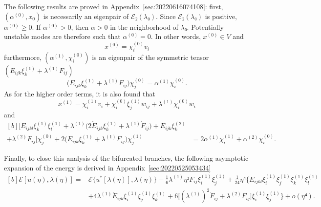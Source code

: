 \documentclass[12pt, final]{scrartcl}
\theoremstyle{definition}
\newcommand{\order}[2][1]{#2^{(#1)}}
\begin{document}
The following results are proved in Appendix~\ref{sec:20220616074108}: first,
\((\order[0]α, x_0)\) is necessarily an eigenpair of \(ℰ₂(λ₀)\). Since \(ℰ₂ (λ₀)\) is
positive, \(\order[0]α ≥ 0\). If \(\order[0]α>0\), then \(α>0\) in the neighborhood of
\(λ₀\). Potentially unstable modes are therefore such that \(\order[0]α=0\). In other
words, \(\order[0]x ∈ V\) and
\begin{equation}
  \label{eq:20220904160057}
  \order[0]x = \order[0]{χ_i} v_i
\end{equation}
furthermore, \((\order[1]α, \order[0]{χ_i})\) is an eigenpair of the symmetric
tensor \((E_{ijk} \order[1]{ξ_k} + \order[1]λ F_{ij})\)
\begin{equation}
  \label{eq:20220609133608}
  \bigl(E_{ijk} \order[1]{ξ_k} + \order[1]λ F_{ij} \bigr) \order[0]{χ_j} = \order[1]α \order[0]{χ_i}.
\end{equation}
As for the higher order terms, it is also found that
\begin{equation}
  \label{eq:20220609133629}
  \order[1]x = \order[1]{χ_i} v_i +  \order[0]{χ_i} \order[1]{ξ_j} w_{i j} + \order[1]λ \order[0]{χ_i} w_i
\end{equation}
and
\begin{equation}
  \label{eq:20220616082923}
  \begin{aligned}[b]
    \bigl[E_{ijkl} \order[1]{ξ_k} \order[1]{ξ_l} + \order[1]λ\bigl(2 \mathring{E}_{ijk} \order[1]{ξ_k} + \order[1]λ \mathring{F}_{ij}\bigr) + E_{ijk} \order[2]{ξ_k}
    &\\
    + \order[2]λ F_{ij} \bigr] \order[0]{χ_j} + 2\bigl(E_{ijk}  \order[1]{ξ_k} + \order[1]λ F_{ij} \bigr) \order[1]{χ_j}
    & = 2\order[1]α\order[1]{χ_i} + \order[2]α \order[0]{χ_i}.
  \end{aligned}
\end{equation}

Finally, to close this analysis of the bifurcated branches, the following
asymptotic expansion of the energy is derived in
Appendix~\ref{sec:20220525053434}
\begin{equation}
  \label{eq:20220525053600}
  \begin{aligned}[b]
    ℰ[u(η), λ(η)] ={} & ℰ\{u^{\ast}[λ(η)], λ(η)\} + \tfrac{1}{6} \order[1]λ η³ F_{i j} \order[1]{ξ_i} \order[1]{ξ_j} + \tfrac{1}{24} η⁴ \bigl\{E_{ijkl} \order[1]{ξ_i} \order[1]{ξ_j} \order[1]{ξ_k} \order[1]{ξ_l}\\
    & + 4\order[1]λ \mathring{E}_{ijk} \order[1]{ξ_i} \order[1]{ξ_j} \order[1]{ξ_k} + 6 \bigl[( \order[1]λ )^2 \mathring{F}_{ij} + \order[2]λ F_{ij}\bigr] \order[1]{ξ_i} \order[1]{ξ_j}\bigr\} + o(η⁴).
  \end{aligned}
\end{equation}
\end{document}
